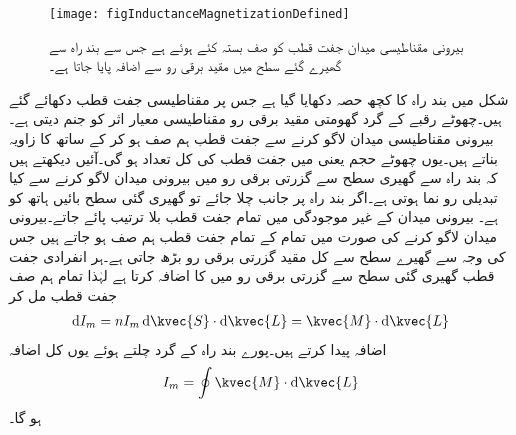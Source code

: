 \begin{figure}
\centering
\texttt{[image: figInductanceMagnetizationDefined]}
\caption{بیرونی مقناطیسی میدان جفت قطب کو صف بستہ کئے ہوئے ہے جس سے بند راہ سے گھیرے گئے سطح میں مقید برقی رو سے اضافہ پایا جاتا ہے۔}
\label{شکل_امالہ_مقناطیسیت_تعریف}
\end{figure}

شکل  میں بند راہ کا کچھ حصہ  دکھایا گیا ہے جس پر مقناطیسی جفت قطب دکھائے گئے ہیں۔چھوٹے رقبے  کے گرد گھومتی مقید برقی رو  مقناطیسی معیار اثر  کو جنم دیتی ہے۔بیرونی مقناطیسی میدان لاگو کرنے سے جفت قطب ہم صف ہو کر  کے ساتھ  کا زاویہ بناتے ہیں۔یوں چھوٹے حجم  یعنی  میں جفت قطب کی کل تعداد  ہو گی۔آئیں دیکھتے ہیں کہ بند راہ سے گھیری سطح سے گزرتی برقی رو میں بیرونی میدان لاگو کرنے سے کیا تبدیلی رو نما ہوتی ہے۔اگر بند راہ پر  جانب چلا جائے تو گھیری گئی سطح بائیں ہاتھ کو ہے۔ بیرونی میدان کے غیر موجودگی میں تمام جفت قطب بلا ترتیب پائے جاتے۔بیرونی میدان  لاگو کرنے کی صورت میں تمام کے تمام  جفت قطب ہم صف ہو جاتے ہیں جس کی وجہ سے  گھیرے سطح سے کل مقید گزرتی برقی رو بڑھ جاتی ہے۔ہر انفرادی جفت قطب گھیری گئی سطح سے گزرتی برقی رو میں  کا اضافہ کرتا ہے لہٰذا تمام ہم صف جفت قطب مل کر
\begin{align}
\dif I_m=n I_m \dif \kvec{S} \cdot \dif \kvec{L}=\kvec{M} \cdot \dif \kvec{L}
\end{align}
اضافہ پیدا کرتے ہیں۔پورے بند راہ کے گرد چلتے ہوئے یوں کل اضافہ
\begin{align}\label{مساوات_امالہ_مقید_برقی_رو_اور_مقناطیسیت}
I_m=\oint \kvec{M} \cdot \dif \kvec{L}
\end{align}
ہو گا۔ 


